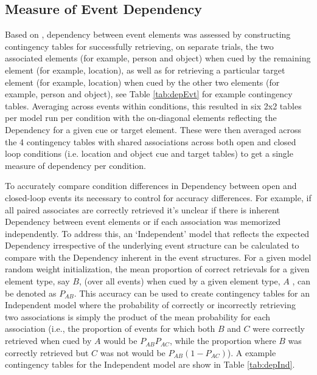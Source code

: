 \documentclass[11pt, titlepage, twoside]{article}
\begin{document}
\subsection{Measure of Event Dependency} 
\label{sec:CalcDep}
Based on \textcite{HornerBisbyBushEtAl15}, dependency between event elements was assessed by constructing contingency tables for successfully retrieving, on separate trials, the two associated elements (for example, person and object) when cued by the remaining element (for example, location), as well as for retrieving a particular target element (for example, location) when cued by the other two elements (for example, person and object), see Table \ref{tab:depEvt} for example contingency tables. Averaging across events within conditions, this resulted in six 2x2 tables per model run per condition with the on-diagonal elements reflecting the Dependency for a given cue or target element.  These were then averaged across the 4 contingency tables with shared associations across both open and closed loop conditions (i.e. location and object cue and target tables) to get a single measure of dependency per condition.

To accurately compare condition differences in Dependency between open and closed-loop events its necessary to control for accuracy differences.  For example, if all paired associates are correctly retrieved it's unclear if there is inherent Dependency between event elements or if each association was memorized independently.   To address this, an `Independent' model that reflects the expected Dependency irrespective of the underlying event structure can be calculated to compare with the Dependency inherent in the event structures. For a given model random weight initialization, the mean proportion of correct retrievals for a given element type, say $B$, (over all events) when cued by a given element type, $A$ , can be denoted as $P_{AB}$. This accuracy can be used to create contingency tables for an Independent model where the probability of correctly or incorrectly retrieving two associations is simply the product of the mean probability for each association (i.e., the proportion of events for which both $B$ and $C$ were correctly retrieved when cued by $A$ would be $P_{AB}  P_{AC}$, while the proportion where $B$ was correctly retrieved but $C$ was not would be $P_{AB}(1-P_{AC})$).  A example contingency tables for the Independent model are show in Table \ref{tab:depInd}.
\end{document}
